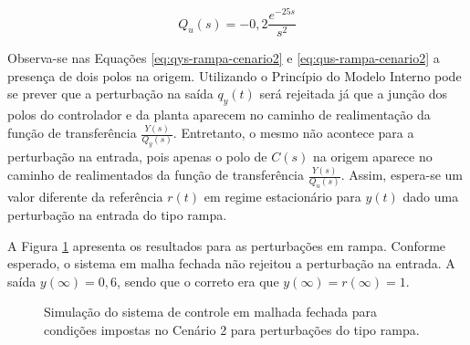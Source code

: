\begin{equation}
    \label{eq:qus-rampa-cenario2}
    Q_{u}(s) = -0,2\frac{e^{-25s}}{s^{2}}
\end{equation}

Observa-se nas Equações \ref{eq:qys-rampa-cenario2} e
\ref{eq:qus-rampa-cenario2} a presença de dois polos na origem. Utilizando o
Princípio do Modelo Interno pode se prever que a perturbação na saída $q_{y}(t)$
será rejeitada já que a junção dos polos do controlador e da planta aparecem no
caminho de realimentação da função de transferência $\frac{Y(s)}{Q_{y}(s)}$.
Entretanto, o mesmo não acontece para a perturbação na entrada, pois apenas o
polo de $C(s)$ na origem aparece no caminho de realimentados da função de
transferência $\frac{Y(s)}{Q_{u}(s)}$. Assim, espera-se um valor diferente da
referência $r(t)$ em regime estacionário para $y(t)$ dado uma perturbação na
entrada do tipo rampa.

A Figura \ref{fig:resultado-desafio1-cenario2-b} apresenta os resultados para as
perturbações em rampa. Conforme esperado, o sistema em malha fechada não
rejeitou a perturbação na entrada. A saída $y(\infty) = 0,6$, sendo que o correto
era que $y(\infty) = r(\infty) = 1$.

\begin{figure}[!ht]
    \caption{Simulação do sistema de controle em malhada fechada para condições
    impostas no Cenário 2 para perturbações do tipo rampa.}
    \vspace{-10pt}
    \hspace{-30pt}
    \label{fig:resultado-desafio1-cenario2-b}
    \begin{minipage}{\linewidth}
        
    \end{minipage}
\end{figure}